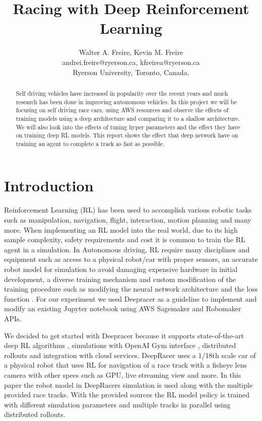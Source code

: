 \documentclass[journal]{IEEEtran}
\begin{document}
\title{Racing with Deep Reinforcement Learning}
\author{Walter A. Freire, Kevin M. Freire\\
andrei.freire@ryerson.ca, kfreirea@ryerson.ca\\
Ryerson University, Toronto, Canada.}
\maketitle
\begin{abstract}
Self driving vehicles have increased in popularity over the recent years and much research has been done in improving autonomous vehicles.  In this project we will be focusing on self driving race cars, using AWS resources and observe the effects of training models using a deep architecture and comparing it to a shallow architecture.  We will also look into the effects of tuning hyper parameters and the effect they have on training deep RL models.  This report shows the effect that deep network have on training an agent to complete a track as fast as possible.
\end{abstract}

\section{Introduction}
Reinforcement Learning (RL) has been used to accomplish various robotic tasks such as manipulation, navigation, flight, interaction, motion planning and many more. When implementing an RL model into the real world, due to its high sample complexity, safety requirements and cost it is common to train the RL agent in a simulation. In Autonomous driving, RL require many disciplines and equipment such as access to a physical robot/car with proper sensors, an accurate robot model for simulation to avoid damaging expensive hardware in initial development, a diverse training mechanism and custom modification of the training procedure such as modifying the neural network architecture and the loss function \cite{9197465}. For our experiment we used Deepracer as a guideline to implement and modify an existing Jupyter notebook using AWS Sagemaker and Robomaker APIs.

We decided to get started with Deepracer because it supports state-of-the-art deep RL algorithms \cite{caspi10reinforcement}, simulations with OpenAI Gym interface \cite{brockman2016openai}, distributed rollouts and integration with cloud services. DeepRacer uses a 1/18th scale car of a physical robot that uses RL for navigation of a race track with a fisheye lens camera \cite{9197465} with other specs such as GPU, live streaming view and more. In this paper the robot model in DeepRacers simulation is used along with the multiple provided race tracks. With the provided sources the RL model policy is trained with different simulation parameters and multiple tracks in parallel using distributed rollouts.
\end{document}
